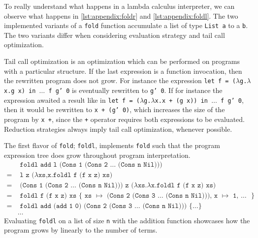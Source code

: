To really understand what happens in a lambda calculus interpreter, we can observe what happens in \autoref{lst:appendix:foldr} and \autoref{lst:appendix:foldl}.
The two implemented variants of a \texttt{fold} function accumulate a list of type \texttt{List a} to a \texttt{b}.
The two variants differ when considering evaluation strategy and tail call optimization.
\begin{remark}\label{remark:tailcall}
	Tail call optimization is an optimization which can be performed on programs with a particular structure.
	If the last expression is a function invocation, then the rewritten program does not grow.
	For instance the expression \texttt{let f = ($\lambda$g.$\lambda$x.g x) in $\dots$ f g' 0} is eventually rewritten to \texttt{g' 0}.
	If for instance the expression awaited a result like in \texttt{let f = ($\lambda$g.$\lambda$x.x + (g x)) in $\dots$ f g' 0}, then it would be rewritten to \texttt{x + (g' 0)}, which increases the size of the program by \texttt{x +}, since the \texttt{+} operator requires both expressions to be evaluated.
	Reduction strategies always imply tail call optimization, whenever possible.
\end{remark}

The first flavor of \texttt{fold}; \texttt{foldl}, implements \texttt{fold} such that the program expression tree does grow throughout program interpretation.
\begin{align}
	  & \texttt{ foldl add l (Cons 1 (Cons 2 $\dots$ (Cons n Nil)))}                                                                \\
	= & \texttt{ l z ($\lambda$xs,x.foldl f (f x z) xs)}  \tag*{}                                                                   \\
	= & \texttt{ (Cons 1 (Cons 2 $\dots$ (Cons n Nil))) z ($\lambda$xs.$\lambda$x.foldl f (f x z) xs)}  \tag*{}                              \\
	= & \texttt{ foldl f (f x z) xs $\{$ xs $\mapsto$ (Cons 2 (Cons 3 $\dots$ (Cons n Nil))), x $\mapsto$ 1, $\dots$ $\}$}  \tag*{} \\
	= & \texttt{ foldl add (add 1 0) (Cons 2 (Cons 3 $\dots$ (Cons n Nil))) $\{ \dots \}$}  \tag*{}                                 \\
	  & \dots \tag*{}
\end{align}
Evaluating \texttt{foldl} on a list of size \texttt{n} with the addition function showcases how the program grows by linearly to the number of terms.

